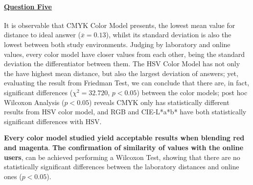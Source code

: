 \paragraph{\ul{Question Five}}
%
It is observable that CMYK Color Model presents, the lowest mean value for distance to ideal answer ($\overline{x} = 0.13$), whilst its standard deviation is also the lowest between both study environments.
Judging by laboratory and online values, every color model have closer values from each other, being the standard deviation the differentiator between them. The HSV Color Model has not only the have highest
mean distance, but also the largest deviation of answers; yet, evaluating the result from Friedman Test, we can conclude that there are, in fact, significant differences ($\chi^2 = 32.720$, $p < 0.05$) between
the color models; post hoc Wilcoxon Analysis ($p < 0.05$) reveals CMYK only has statistically different results from HSV color model, and RGB and CIE-L*a*b* have both statistically significant differences with HSV. \par
%
\textbf{Every color model studied yield acceptable results when blending red and magenta}. \textbf{The confirmation of similarity of values with the online users}, can be achieved performing a Wilcoxon Test, showing that there are no statistically significant differences between the laboratory distances and online ones ($p < 0.05$).
%
